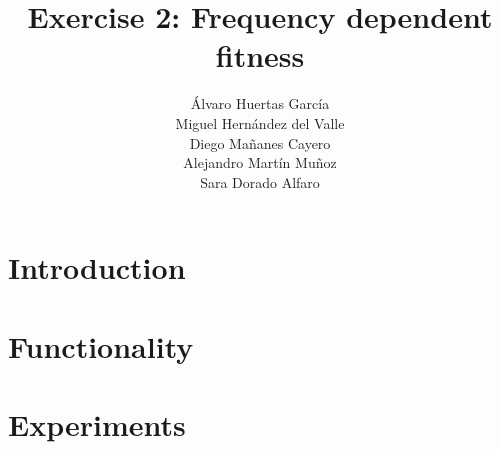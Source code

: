 \documentclass[11pt]{beamer}
\title[Frequency dependent fitness]{Exercise 2: Frequency dependent fitness}
\author[Group 5]{Álvaro Huertas García \\ Miguel Hernández del Valle \\ Diego Mañanes Cayero\\ Alejandro Martín Muñoz \\Sara Dorado Alfaro }
\begin{document}
\frame{\titlepage}
\frame{\tableofcontents}

\section{Introduction} 


\section{Functionality}


\section{Experiments}



\frame{\titlepage}
\end{document}
